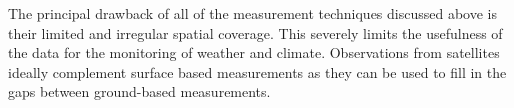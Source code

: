 The principal drawback of all of the measurement techniques discussed above is
their limited and irregular spatial coverage. This severely limits the
usefulness of the data for the monitoring of weather and climate. Observations
from satellites ideally complement surface based measurements as they can be
used to fill in the gaps between ground-based measurements.

